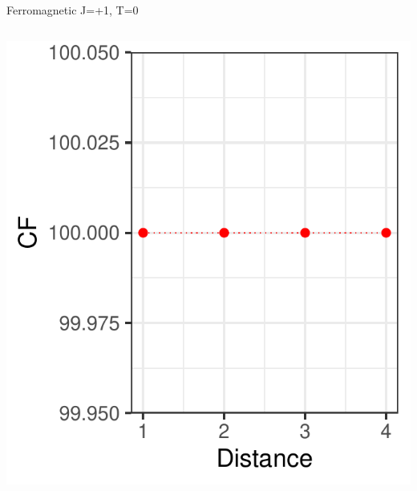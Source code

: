 \documentclass{beamer}
\begin{document}
\begin{frame}{Ferromagnetic J=+1, T=0}
\begin{columns}
\begin{column}{0.5\textwidth}
\begin{center}
     \includegraphics[width=\textwidth]{Pic/J+1_10_6000_T=0_Coherence.pdf}
     \end{center}
\end{column}
\end{columns}
\end{frame}
\end{document}
